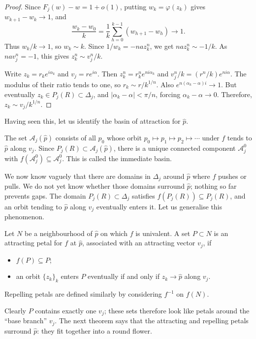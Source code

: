 \documentclass[11pt,a4paper]{article}
\begin{document}
\begin{proof}
Since $F_j(w)-w=1+o(1)$, putting $w_k=\varphi(z_k)$ gives $w_{k+1}-w_k\to1$, and
\[
\frac{w_k-w_0}{k}=\frac1k\sum_{h=0}^{k-1}(w_{h+1}-w_h)\longrightarrow1.
\]
Thus $w_k/k\to1$, so $w_k\sim k$. Since $1/w_k=-naz_k^n$, we get $naz_k^n\sim-1/k$. As $nav_j^n=-1$, this gives $z_k^n\sim v_j^n/k$.

Write $z_k=r_ke^{i\alpha_k}$ and $v_j=re^{i\alpha}$. Then $z_k^n=r_k^ne^{ni\alpha_k}$ and $v_j^n/k=(r^n/k)e^{ni\alpha}$. The modulus of their ratio tends to one, so $r_k\sim r/k^{1/n}$. Also $e^{n(\alpha_k-\alpha)i}\to1$. But eventually $z_k\in P_j(R)\subset\Delta_j$, and $|\alpha_k-\alpha|<\pi/n$, forcing $\alpha_k-\alpha\to0$. Therefore, $z_k\sim v_j/k^{1/n}$.
\end{proof}
Having seen this, let us identify the basin of attraction for $\widehat p$.
\setcounter{definition}{11}\begin{definition}
The set $\mathcal A_j(\widehat p)$ consists of all $p_0$ whose orbit $p_0\mapsto p_1\mapsto p_2\mapsto\cdots$ under $f$ tends to $\widehat p$ along $v_j$. Since $P_j(R)\subset\mathcal A_j(\widehat p)$, there is a unique connected component $\mathcal A_j^0$ with $f(\mathcal A_j^0)\subseteq\mathcal A_j^0$. This is called the immediate basin.
\end{definition}
We now know vaguely that there are domains in $\Delta_j$ around $\widehat p$ where $f$ pushes or pulls. We do not yet know whether those domains surround $\widehat p$; nothing so far prevents gaps. The domain $P_j(R)\subset\Delta_j$ satisfies $f(P_j(R))\subseteq P_j(R)$, and an orbit tending to $\widehat p$ along $v_j$ eventually enters it. Let us generalise this phenomenon.
\setcounter{definition}{12}\begin{definition}
Let $N$ be a neighbourhood of $\widehat p$ on which $f$ is univalent. A set $P\subset N$ is an attracting petal for $f$ at $\widehat p$, associated with an attracting vector $v_j$, if
\begin{itemize}
\item $f(P)\subseteq P$;
\item an orbit $\{z_k\}_k$ enters $P$ eventually if and only if $z_k\to\widehat p$ along $v_j$.
\end{itemize}
Repelling petals are defined similarly by considering $f^{-1}$ on $f(N)$.
\end{definition}
Clearly $P$ contains exactly one $v_j$; these sets therefore look like petals around the ``base branch'' $v_j$. The next theorem says that the attracting and repelling petals surround $\widehat p$: they fit together into a round flower.
\end{document}

